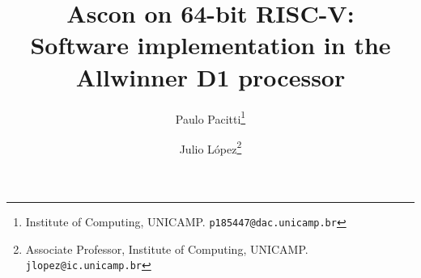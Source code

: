 \documentclass[11pt,twoside]{article}
\begin{document}
% 
\TRMakeCover


%
\pagestyle{myheadings}
\thispagestyle{empty}

%
\title{Ascon on 64-bit RISC-V: \\ Software implementation in the Allwinner D1 processor}

\author{Paulo Pacitti\thanks{Institute of Computing, UNICAMP. \texttt{p185447@dac.unicamp.br}} \and
  Julio  López\thanks{Associate Professor, Institute of Computing, UNICAMP. \texttt{jlopez@ic.unicamp.br}}}
\date{}
\maketitle

\end{document}
